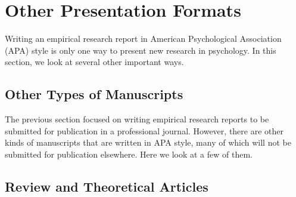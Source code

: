 \section{Other Presentation Formats}


Writing an empirical research report in American Psychological Association (APA) style is only one way to present new research in psychology. In this section, we look at several other important ways.


\subsection{Other Types of Manuscripts}

The previous section focused on writing empirical research reports to be submitted for publication in a professional journal. However, there are other kinds of manuscripts that are written in APA style, many of which will not be submitted for publication elsewhere. Here we look at a few of them.


\subsection{Review and Theoretical Articles}

